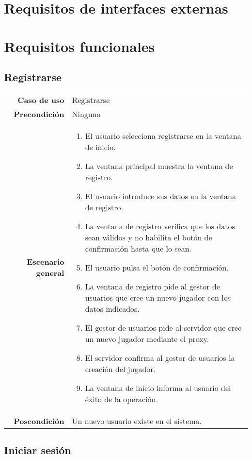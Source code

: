 \section{Requisitos de interfaces externas}

\section{Requisitos funcionales}

\subsection{Registrarse}

{\footnotesize
\begin{tabularx}{0.95\textwidth}{r|X}

\textbf{Caso de uso} & Registrarse \\

\textbf{Precondición} & Ninguna \\

\textbf{Escenario general} & \begin{enumerate}
\item El usuario selecciona registrarse en la ventana de inicio.
\item La ventana principal muestra la ventana de registro.
\item El usuario introduce sus datos en la ventana de registro.
\item La ventana de registro verifica que los datos sean válidos y no habilita
el botón de confirmación hasta que lo sean.
\item El usuario pulsa el botón de confirmación.
\item La ventana de registro pide al gestor de usuarios que cree un nuevo
jugador con los datos indicados.
\item El gestor de usuarios pide al servidor que cree un nuevo jugador mediante
el proxy.
\item El servidor confirma al gestor de usuarios la creación del jugador.
\item La ventana de inicio informa al usuario del éxito de la operación.
\end{enumerate} \\

\textbf{Poscondición} & Un nuevo usuario existe en el sistema.

\end{tabularx}
}

\subsection{Iniciar sesión}

